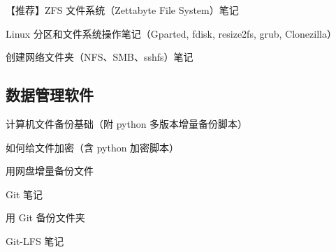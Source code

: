 【推荐】ZFS 文件系统（Zettabyte File System）笔记

Linux 分区和文件系统操作笔记（Gparted, fdisk, resize2fs, grub, Clonezilla）

创建网络文件夹（NFS、SMB、sshfs）笔记


\subsection{数据管理软件}
计算机文件备份基础（附 python 多版本增量备份脚本）

如何给文件加密（含 python 加密脚本）

用网盘增量备份文件

Git 笔记

用 Git 备份文件夹

Git-LFS 笔记
